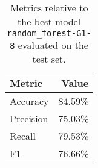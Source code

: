 \begin{table}[H]
\centering
\capstart
\begin{tabularx}{0.48\textwidth}{|X|r|}
\hline
Metric & Value \\
\hline
Accuracy & 84.59\% \\
Precision & 75.03\% \\
Recall & 79.53\% \\
F1 & 76.66\% \\
\hline
\end{tabularx}
\caption{Metrics relative to the best model \texttt{random\_forest-G1-8} evaluated on the test set.}
\label{tab:best_model_metrics_test}

\end{table}
